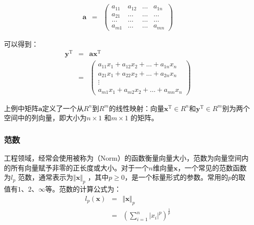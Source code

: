 \begin{eqnarray}
\mathbf a&=&
\begin{pmatrix}
   a_{11} & a_{12} & \dots & a_{1n}\\
   a_{21} & \dots & \dots & \dots \\
   \dots & \dots & \dots & \dots \\
   a_{m1} & \dots & \dots & a_{mn}
\end{pmatrix}
\label{eq:5-12}
\end{eqnarray}

\parinterval 可以得到：
\begin{eqnarray}
\mathbf y^{\textrm{T}}& = &\mathbf a\mathbf x^{\textrm{T}} \nonumber \\
               & = &
\begin{pmatrix}
   a_{11}x_{1}+a_{12}x_{2}+\dots+a_{1n}x_{n}\\
   a_{21}x_{1}+a_{22}x_{2}+\dots+a_{2n}x_{n}\\
   \vdots \\
   a_{m1}x_{1}+a_{m2}x_{2}+\dots+a_{mn}x_{n}
\label{eq:5-13}\end{pmatrix}
\end{eqnarray}

\parinterval 上例中矩阵$ \mathbf a $定义了一个从$ R^n $到$ R^m $的线性映射：向量$ \mathbf x^{\textrm{T}}\in R^n $和$ \mathbf y^{\textrm{T}}\in R^m $别为两个空间中的列向量，即大小为$ n\times 1 $ 和$ m\times 1 $ 的矩阵。


\subsubsection{范数}

\parinterval 工程领域，经常会使用被称为{\small{}}（Norm）的函数衡量向量大小，范数为向量空间内的所有向量赋予非零的正长度或大小。对于一个$n$维向量$ \mathbf x $，一个常见的范数函数为$ l_p $ 范数，通常表示为$ {\Vert{\mathbf x}\Vert}_p $ ，其中$p\ge 0$，是一个标量形式的参数。常用的$ p $的取值有$ 1 $、$ 2 $、$ \infty $等。范数的计算公式为：
\begin{eqnarray}
l_p(\mathbf x) & = & {\Vert{\mathbf x}\Vert}_p \nonumber \\
               & = & {\left (\sum_{i=1}^{n}{{\vert x_{i}\vert}^p}\right )}^{\frac{1}{p}}
\label{eq:5-14}
\end{eqnarray}

